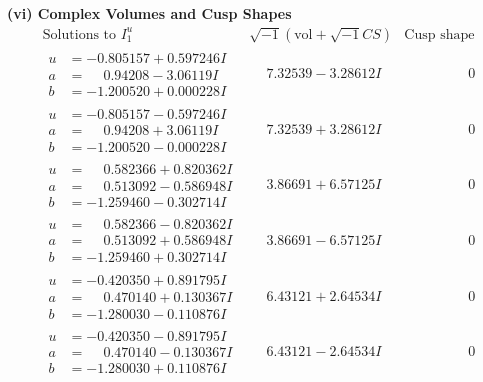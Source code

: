 \documentclass[1p]{elsarticle_modified}
\theoremstyle{definition}
\newcommand{\I}{\sqrt{-1}}
\begin{document}
\newpage\flushleft \textbf{(vi) Complex Volumes and Cusp Shapes}
$$\begin{array}{c|c|c}  
\text{Solutions to }I^u_{1}& \I (\text{vol} + \sqrt{-1}CS) & \text{Cusp shape}\\
 \hline 
\begin{aligned}
u &= -0.805157 + 0.597246 I \\
a &= \phantom{-}0.94208 - 3.06119 I \\
b &= -1.200520 + 0.000228 I\end{aligned}
 & \phantom{-}7.32539 - 3.28612 I & \phantom{-0.000000 } 0 \\ \hline\begin{aligned}
u &= -0.805157 - 0.597246 I \\
a &= \phantom{-}0.94208 + 3.06119 I \\
b &= -1.200520 - 0.000228 I\end{aligned}
 & \phantom{-}7.32539 + 3.28612 I & \phantom{-0.000000 } 0 \\ \hline\begin{aligned}
u &= \phantom{-}0.582366 + 0.820362 I \\
a &= \phantom{-}0.513092 - 0.586948 I \\
b &= -1.259460 - 0.302714 I\end{aligned}
 & \phantom{-}3.86691 + 6.57125 I & \phantom{-0.000000 } 0 \\ \hline\begin{aligned}
u &= \phantom{-}0.582366 - 0.820362 I \\
a &= \phantom{-}0.513092 + 0.586948 I \\
b &= -1.259460 + 0.302714 I\end{aligned}
 & \phantom{-}3.86691 - 6.57125 I & \phantom{-0.000000 } 0 \\ \hline\begin{aligned}
u &= -0.420350 + 0.891795 I \\
a &= \phantom{-}0.470140 + 0.130367 I \\
b &= -1.280030 - 0.110876 I\end{aligned}
 & \phantom{-}6.43121 + 2.64534 I & \phantom{-0.000000 } 0 \\ \hline\begin{aligned}
u &= -0.420350 - 0.891795 I \\
a &= \phantom{-}0.470140 - 0.130367 I \\
b &= -1.280030 + 0.110876 I\end{aligned}
 & \phantom{-}6.43121 - 2.64534 I & \phantom{-0.000000 } 0 \\ \hline\begin{aligned}

\end{aligned}
\end{array}$$
\end{document}
